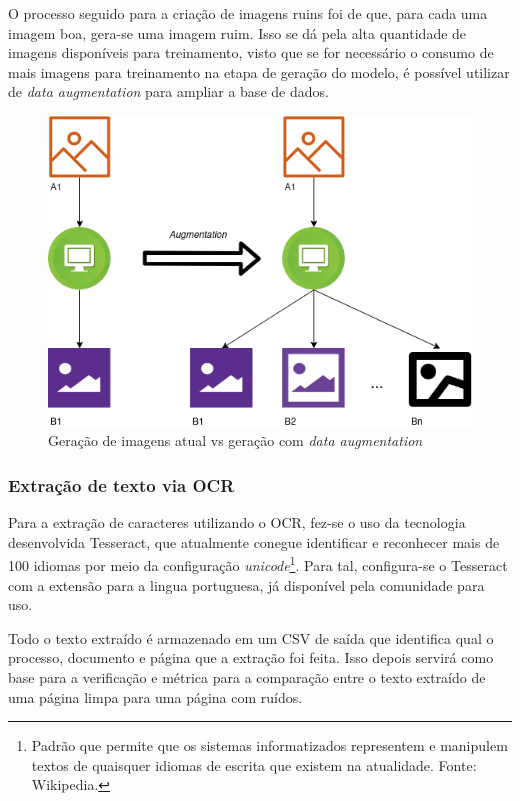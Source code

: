 O processo seguido para a criação de imagens ruins foi de que, para cada uma imagem boa, gera-se uma imagem ruim. Isso se dá pela alta quantidade de imagens disponíveis para treinamento, visto que se for necessário o consumo de mais imagens para treinamento na etapa de geração do modelo, é possível utilizar de \textit{data augmentation} para ampliar a base de dados.

\begin{figure}[H]
  \centering
  \includegraphics[scale=.6]{figuras/data-augmentation.png}
  \caption{Geração de imagens atual vs geração com \textit{data augmentation}}
  \label{fig:data-augmentation}
\end{figure}

\subsubsection{Extração de texto via OCR}

Para a extração de caracteres utilizando o OCR, fez-se o uso da tecnologia desenvolvida Tesseract, que atualmente conegue identificar e reconhecer mais de 100 idiomas por meio da configuração \textit{unicode}\footnote{
  Padrão que permite que os sistemas informatizados representem e manipulem textos de quaisquer idiomas de escrita que existem na atualidade. Fonte: Wikipedia.
}. Para tal, configura-se o Tesseract com a extensão para a lingua portuguesa, já disponível pela comunidade para uso.

Todo o texto extraído é armazenado em um CSV de saída que identifica qual o processo, documento e página que a extração foi feita. Isso depois servirá como base para a verificação e métrica para a comparação entre o texto extraído de uma página limpa para uma página com ruídos.

